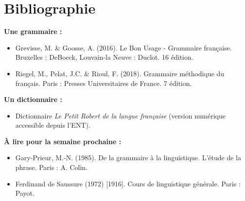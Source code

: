 \section{Bibliographie}

\textbf{Une grammaire :}
\begin{itemize}
   \item Grevisse, M. \& Goosse, A. (2016). Le Bon Usage - Grammaire française. Bruxelles : DeBoeck, Louvain-la Neuve : Duclot. 16 édition.
   \item Riegel, M., Pelat, J.C. \& Rioul, F. (2018). Grammaire méthodique du français. Paris : Presses Universitaires de France. 7 édition.
\end{itemize}

\textbf{Un dictionnaire :}
\begin{itemize}
   \item Dictionnaire \textit{Le Petit Robert de la langue française} (version numérique accessible depuis l'ENT).
\end{itemize}

\textbf{À lire pour la semaine prochaine :}
\begin{itemize}
   \item Gary-Prieur, M.-N. (1985). De la grammaire à la linguistique. L'étude de la phrase. Paris : A. Colin.
   \item Ferdinand de Saussure (1972) [1916]. Cours de linguistique générale. Paris : Payot.
\end{itemize}
